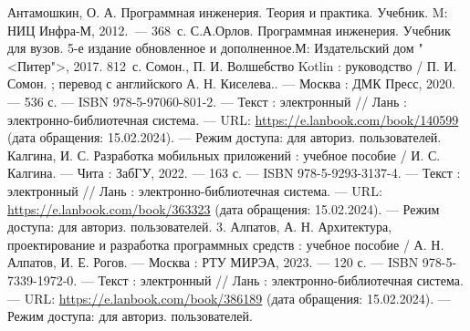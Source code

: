 \begin{thebibliography}{00}
	\bibitem{} Антамошкин, О. А. Программная инженерия. Теория и практика.
		Учебник. M: НИЦ Инфра-М, 2012.~--- 368~с.
	\bibitem{} С.А.Орлов. Программная инженерия.
		Учебник для вузов. 5-е издание обновленное и дополненное.М:
		Издательский дом "<Питер">, 2017. 812~с.
	\bibitem{} Сомон., П. И. Волшебство Kotlin : руководство / П. И. Сомон. ;
		перевод с английского А. Н. Киселева.. — Москва :
		ДМК Пресс, 2020. — 536 с. — ISBN 978-5-97060-801-2. — Текст :
		электронный // Лань : электронно-библиотечная система. — URL:
		\url{https://e.lanbook.com/book/140599} (дата обращения: 15.02.2024).
		— Режим доступа: для авториз. пользователей.
	\bibitem{} Калгина, И. С. Разработка мобильных приложений :
		учебное пособие / И. С. Калгина. — Чита : ЗабГУ, 2022. — 163 с.
		— ISBN 978-5-9293-3137-4. — Текст : электронный // Лань :
		электронно-библиотечная система.
		— URL: \url{https://e.lanbook.com/book/363323}
		(дата обращения: 15.02.2024). — Режим доступа:
		для авториз. пользователей.
	\bibitem{} 3. Алпатов, А. Н. Архитектура, проектирование
		и разработка программных средств :
		учебное пособие / А. Н. Алпатов, И. Е. Рогов. — Москва :
		РТУ МИРЭА, 2023. — 120 с. — ISBN 978-5-7339-1972-0. — Текст :
		электронный // Лань : электронно-библиотечная система.
		— URL: \url{https://e.lanbook.com/book/386189}
		(дата обращения: 15.02.2024). — Режим доступа: для авториз.
		пользователей.

\end{thebibliography}



